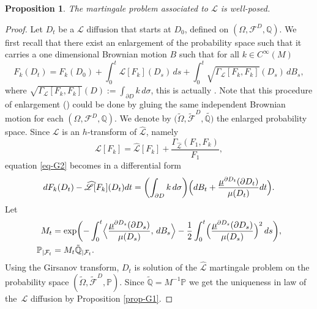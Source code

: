 \documentclass[JEP,XML,SOM,Unicode,NoFloatCountersInSection,published]{cedram}
\theoremstyle{plain}
\newtheorem{prop}[thm]{Proposition}
\theoremstyle{definition}
\newcommand{\SL}{{\mathscr L}}
\newcommand{\usm}{{\underline{\smash{\mu}}}}
\begin{document}
\begin{prop}\label{prop-G2}
The martingale problem associated to $\SL$ is well-posed.
\end{prop}
\begin{proof}
Let $D_t$ be a $\SL $ diffusion that starts at $D_0$, defined on $(\Omega,\mathcal{F}^D,\mathbb{Q})$. We first recall that there exist an enlargement of the probability space such that it carries a one dimensional Brownian motion $ B$ such that for all $ k \in C^{\infty}(M) $\vspace*{-3pt}
\begin{equation}\label{eq-G2}
F_k(D_t)=F_k(D_0)+\int_0^t \SL[F_k](D_s)\,ds +\int_0^t\sqrt{\Gamma_{\SL}[F_k,F_k]}(D_s)\, dB_s,
\end{equation}
where $\sqrt{\Gamma_{\SL}[F_k,F_k]}(D):= \int_{\partial D} k\, d\sigma $, this is actually \cite[Prop.\,53]{zbMATH07470497}. Note that this procedure of enlargement (\cite[Chap.\,V, Th.\,1.7]{MR1725357}) could be done by gluing the same independent Brownian motion for each $(\Omega,\mathcal{F}^D,\mathbb{Q})$. We denote by $ (\tilde{\Omega},\tilde{\mathcal{F}}^D,\tilde{\mathbb{Q})}$ the enlarged probability space. Since $\SL $ is an $h$-transform of $\widehat{\SL}$, namely\vspace*{-3pt}
\[
\SL[F_k] = \widehat{\SL}[F_k] +\frac{\Gamma_{\widehat{\SL}}( F_1,F_k)}{F_1},
\]
equation \eqref{eq-G2} becomes in a differential form\vspace*{-3pt}
\begin{equation}%
dF_k(D_t)- \widehat{\SL}[F_k](D_t) dt = \biggl(\int_{\partial D} k\, d\sigma\biggr)\Bigl(dB_t + \frac{\usm^{\partial D_t}(\partial D_t)}{\mu(D_t)}dt\Bigr).
\end{equation}
Let\vspace*{-3pt}
\begin{align*}
M_t &= \exp\biggl(-\int_0^t \Bigl\langle \frac{\usm^{\partial D_s}(\partial D_s)}{\mu(D_s)}, \, dB_s \Bigr\rangle -\frac12 \int_0^t\Bigl(\frac{\usm^{\partial D_s}(\partial D_s)}{\mu(D_s)} \Bigr)^2 \,ds\biggr),
\\
\mathbb{P}_{\vert \mathcal{F}_t} &= M_t\tilde{\mathbb{Q}}_{\vert \mathcal{F}_t}.
\end{align*}
Using the Girsanov transform, $D_t $ is solution of the $\widehat{\SL} $ martingale problem on the probability space $ (\tilde{\Omega},\tilde{\mathcal{F}}^D,\mathbb{P})$. Since $ \tilde{\mathbb{Q}} = M^{-1}\mathbb{P}$ we get the uniqueness in law of the~$\SL $ diffusion by Proposition \ref{prop-G1}.
\end{proof}
\end{document}

